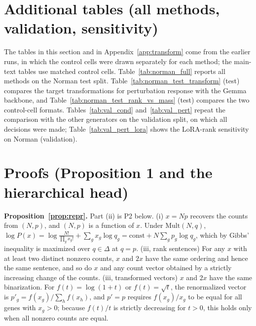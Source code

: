 \FloatBarrier
\section{Additional tables (all methods, validation, sensitivity)}\label{app:val}
The tables in this section and in Appendix~\ref{app:transform} come from the earlier runs, in which the control cells were drawn separately for each method; the main-text tables use matched control cells.
Table~\ref{tab:norman_full} reports all methods on the Norman test split.
Table~\ref{tab:norman_test_transform} (test) compares the target transformations for perturbation response with the Gemma backbone, and Table~\ref{tab:norman_test_rank_vs_mass} (test) compares the two control-cell formats.
Tables~\ref{tab:val_cond} and~\ref{tab:val_pert} repeat the comparison with the other generators on the validation split, on which all decisions were made; Table~\ref{tab:val_pert_lora} shows the LoRA-rank sensitivity on Norman (validation).

\FloatBarrier
\section{Proofs (Proposition 1 and the hierarchical head)}\label{app:proofs}
\textbf{Proposition~\ref{prop:repr}.} Part (ii) is P2 below. (i) $x=Np$ recovers the counts from $(N,p)$, and $(N,p)$ is a function of $x$. Under $\mathrm{Mult}(N,q)$, $\log P(x)=\log\frac{N!}{\prod_gx_g!}+\sum_gx_g\log q_g=\text{const}+N\sum_gp_g\log q_g$, which by Gibbs' inequality is maximized over $q\in\Delta$ at $q=p$. (iii, rank sentences) For any $x$ with at least two distinct nonzero counts, $x$ and $2x$ have the same ordering and hence the same sentence, and so do $x$ and any count vector obtained by a strictly increasing change of the counts. (iii, transformed vectors) $x$ and $2x$ have the same binarization. For $f(t)=\log(1+t)$ or $f(t)=\sqrt t$, the renormalized vector is $p'_g=f(x_g)/\sum_hf(x_h)$, and $p'=p$ requires $f(x_g)/x_g$ to be equal for all genes with $x_g>0$; because $f(t)/t$ is strictly decreasing for $t>0$, this holds only when all nonzero counts are equal.

